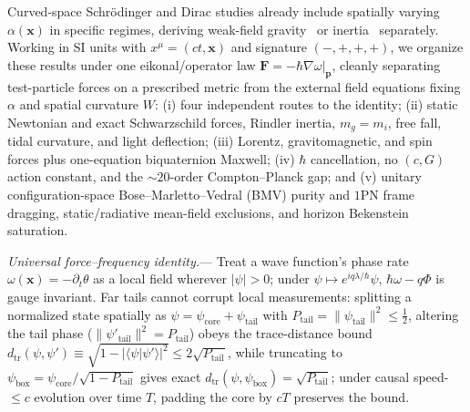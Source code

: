 \documentclass[aps,prl,reprint,superscriptaddress,nofootinbib,floatfix]{revtex4-2}
\theoremstyle{prlthm}
\newcommand{\prlsec}[1]{\par\smallskip\noindent\emph{#1.}---}
\begin{document}
Curved-space Schr\"odinger and Dirac studies already include spatially varying $\alpha(\mathbf{x})$ in specific regimes, deriving weak-field gravity~\citep{Mueller2014Quantum,Czarnecki2021Gravitational} or inertia~\citep{HehlNi1990Inertial,Perche2022Localized} separately. Working in SI units with $x^\mu=(ct,\mathbf{x})$ and signature $(-,+,+,+)$, we organize these results under one eikonal/operator law $\mathbf{F}=-\hbar\nabla\omega|_{\mathbf{p}}$, cleanly separating test-particle forces on a prescribed metric from the external field equations fixing $\alpha$ and spatial curvature $W$: (i) four independent routes to the identity; (ii) static Newtonian and exact Schwarzschild forces, Rindler inertia, $m_g=m_i$, free fall, tidal curvature, and light deflection; (iii) Lorentz, gravitomagnetic, and spin forces plus one-equation biquaternion Maxwell; (iv) $\hbar$ cancellation, no $(c,G)$ action constant, and the $\sim 20$-order Compton--Planck gap; and (v) unitary configuration-space Bose--Marletto--Vedral (BMV) purity and $1$PN frame dragging, static/radiative mean-field exclusions, and horizon Bekenstein saturation.

\prlsec{Universal force--frequency identity}
Treat a wave function's phase rate $\omega(\mathbf{x})=-\partial_t\theta$ as a local field wherever $|\psi|>0$; under $\psi\mapsto e^{iq\lambda/\hbar}\psi$, $\hbar\omega-q\Phi$ is gauge invariant. Far tails cannot corrupt local measurements: splitting a normalized state spatially as $\psi=\psi_\text{core}+\psi_\text{tail}$ with $P_\text{tail}=\|\psi_\text{tail}\|^2\le\tfrac{1}{2}$, altering the tail phase ($\|\psi'_\text{tail}\|^2=P_\text{tail}$) obeys the trace-distance bound $d_\text{tr}(\psi,\psi')\equiv\sqrt{1-|\langle\psi|\psi'\rangle|^2}\le 2\sqrt{P_\text{tail}}$, while truncating to $\psi_\text{box}=\psi_\text{core}/\sqrt{1-P_\text{tail}}$ gives exact $d_\text{tr}(\psi,\psi_\text{box})=\sqrt{P_\text{tail}}$; under causal speed-$\le c$ evolution over time $T$, padding the core by $cT$ preserves the bound.
\end{document}
